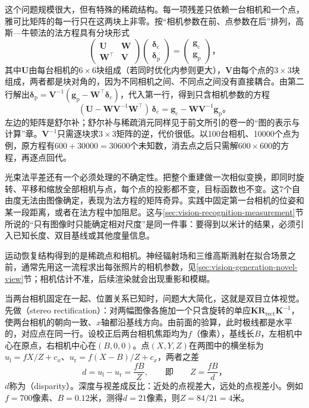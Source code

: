 这个问题规模很大，但有特殊的稀疏结构。每一项残差只依赖一台相机和一个点，雅可比矩阵的每一行只在这两块上非零。按“相机参数在前、点参数在后”排列，高斯—牛顿法的法方程具有分块形式
\[
  \begin{pmatrix}\bm U&\bm W\\\bm W^\top&\bm V\end{pmatrix}
  \begin{pmatrix}\bm\delta_{\mathrm c}\\\bm\delta_{\mathrm p}\end{pmatrix}
  =\begin{pmatrix}\bm g_{\mathrm c}\\\bm g_{\mathrm p}\end{pmatrix}\text{，}
\]
其中$\bm U$由每台相机的$6\times6$块组成（若同时优化内参则更大），$\bm V$由每个点的$3\times3$块组成，两者都是块对角的，因为不同相机之间、不同点之间没有直接耦合。由第二行解出$\bm\delta_{\mathrm p}=\bm V^{-1}(\bm g_{\mathrm p}-\bm W^\top\bm\delta_{\mathrm c})$，代入第一行，得到只含相机参数的方程
\begin{equation}
  (\bm U-\bm W\bm V^{-1}\bm W^\top)\,\bm\delta_{\mathrm c}
  =\bm g_{\mathrm c}-\bm W\bm V^{-1}\bm g_{\mathrm p}\text{。}
  \label{eq:vision-formation-schur}
\end{equation}
左边的矩阵是舒尔补；舒尔补与稀疏消元同样见于前文所引的卷一的“图的表示与计算”章。$\bm V^{-1}$只需逐块求$3\times3$矩阵的逆，代价很低。以100台相机、10000个点为例，原方程有$600+30000=30600$个未知数，消去点之后只需解$600\times600$的方程，再逐点回代。

光束法平差还有一个必须处理的不确定性。把整个重建做一次相似变换，即同时旋转、平移和缩放全部相机与点，每个点的投影都不变，目标函数也不变。这7个自由度无法由图像确定，表现为法方程的矩阵奇异。实践中固定第一台相机的位姿和某一段距离，或者在法方程中加阻尼。这与\ref{sec:vision-recognition-measurement}节所说的“只有图像时只能确定相对尺度”是同一件事：要得到以米计的结果，必须引入已知长度、双目基线或其他度量信息。

运动恢复结构得到的是稀疏点和相机。神经辐射场和三维高斯溅射在拟合场景之前，通常先用这一流程求出每张照片的相机参数，见\ref{sec:vision-generation-novel-view}节；相机估计不准，后续渲染就会出现重影和模糊。

当两台相机固定在一起、位置关系已知时，问题大大简化，这就是双目立体视觉。先做（stereo rectification）：对两幅图像各施加一个只含旋转的单应$\bm K\bm R_{\mathrm{rect}}\bm K^{-1}$，使两台相机的朝向一致、$x$轴都沿基线方向。由前面的验算，此时极线都是水平的，对应点在同一行。设校正后两台相机焦距均为$f$（像素），基线长$B$，左相机中心在原点，右相机中心在$(B,0,0)$。点$(X,Y,Z)$在两图中的横坐标为$u_{\mathrm l}=fX/Z+c_x$、$u_{\mathrm r}=f(X-B)/Z+c_x$，两者之差
\begin{equation}
  d=u_{\mathrm l}-u_{\mathrm r}=\frac{fB}{Z},\qquad\text{即}\qquad Z=\frac{fB}{d}\text{，}
  \label{eq:vision-formation-disparity}
\end{equation}
$d$称为（disparity）。深度与视差成反比：近处的点视差大，远处的点视差小。例如$f=700$像素、$B=0.12$米，测得$d=21$像素，则$Z=84/21=4$米。

